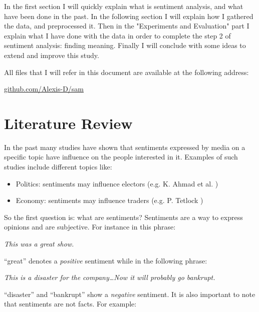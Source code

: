 \documentclass[12pt]{report}
\begin{document}
In the first section I will quickly explain what is sentiment analysis, and what have been done in the past. In the following section I will explain how I gathered the data, and preprocessed it. Then in the "Experiments and Evaluation" part I explain what I have done with the data in order to complete the step 2 of sentiment analysis: finding meaning. Finally I will conclude with some ideas to extend and improve this study.

All files that I will refer in this document are available at the following address:
\begin{center}
	\href{https://github.com/Alexis-D/sam}{github.com/Alexis-D/sam}
\end{center}

\chapter{Literature Review}

In the past many studies have shown that sentiments expressed by media on a specific topic have influence on the people interested in it. Examples of such studies include different topics like:

\begin{itemize}
	\item Politics: sentiments may influence electors (e.g. K. Ahmad et al. \cite{ahmad11})
	\item Economy: sentiments may influence traders (e.g. P. Tetlock \cite{tetlock07})
\end{itemize}

So the first question is: what are sentiments? Sentiments are a way to express opinions and are subjective. For instance in this phrase:

\begin{center}
	\emph{This was a {\color{green}great} show.}
\end{center}

``{\color{green}great}'' denotes a \emph{positive} sentiment while in the following phrase:

\begin{center}
	\emph{This is a {\color{red}disaster} for the company\ldots Now it will probably go {\color{red}bankrupt}.}
\end{center}

``{\color{red}disaster}'' and ``{\color{red}bankrupt}'' show a \emph{negative} sentiment. It is also important to note that sentiments are not facts\cite{wright09}. For example:
\end{document}
